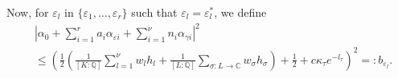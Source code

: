%
%
Now, for $\varepsilon_l$ in $\{\varepsilon_1, \dots, \varepsilon_r\}$ such that $\varepsilon_l = \varepsilon_l^*$, we define
\begin{align*}
&\left|\alpha_0+\sum_{i = 1}^r a_i \alpha_{\varepsilon i} + \sum_{i = 1}^{\nu} n_i \alpha_{\gamma i}\right|^2\\
	& \leq \left(\frac{1}{2}\left(\frac{1}{[K:\mathbb{Q}]}\sum_{l = 1}^{\nu}w_l h_l + \frac{1}{[L:\mathbb{Q}]}\sum_{\sigma :L \to \mathbb{C}} w_{\sigma}h_{\sigma}\right) + \frac{1}{2} + c\kappa_{\tau}e^{-l_{\tau}}\right)^2=:b_{\varepsilon_l}. 
\end{align*} 

%

